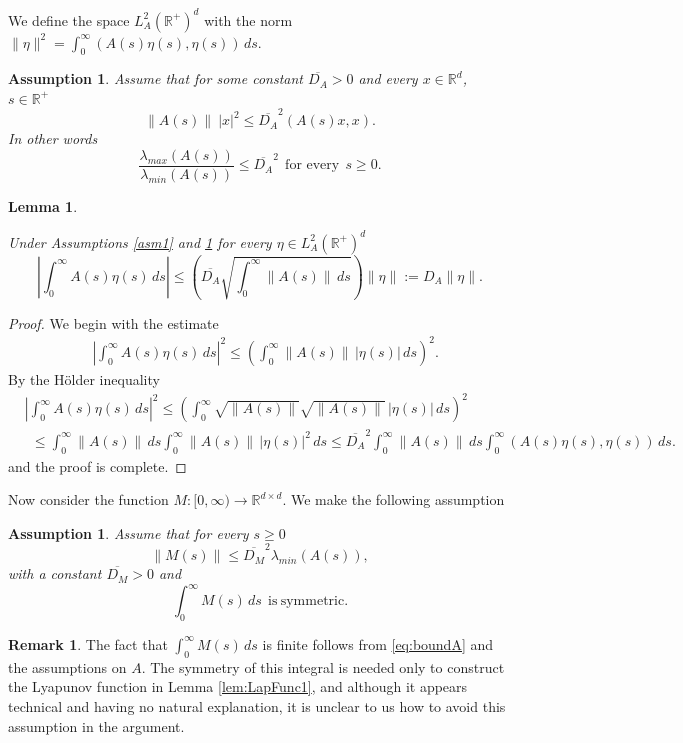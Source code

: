\documentclass[11pt, leqno]{amsart}
\newtheorem{lem}[thm]{Lemma}
\newtheorem{asm}[thm]{Assumption}
\theoremstyle{definition}
\newtheorem{rem}[thm]{Remark}
\def\R{\mathbb{R}}
\begin{document}
We define the space $L^2_A(\R^+)^d$ with the norm  $\|\eta\|^2 = \int_0^\infty (A(s)\eta(s),\eta(s))\, ds.$
\begin{asm} \label{asm:a2}
	Assume that for some constant $\overline{D_A}>0$ and every $x\in \mathbb{R}^d$, $s\in \mathbb{R}^+$
	\begin{equation}\label{eq:A_property}
		\|A(s)\|\ |x|^2 \leq \overline{D_A}^2(A(s)x,x).
	\end{equation}
	In other words
	$$
	\frac{\lambda_{max}(A(s))}{\lambda_{min}(A(s))} \leq \overline{D_A}^2\ \ \textrm{for every}\ \ s\geq 0.
	$$
\end{asm}
\begin{lem}\label{lem:a_prop}
	
	Under Assumptions \ref{asm1} and \ref{asm:a2} for every $\eta \in L^2_A(\mathbb{R}^+)^d$
	$$
	\left|\int_0^\infty A(s)\eta(s)\, ds \right| \leq \left(\overline{D_A}\sqrt{ \int_0^\infty \|A(s)\|\, ds}\right)\|\eta\| := D_A\|\eta\|.
	$$
\end{lem}
\begin{proof} We begin with the estimate
	\begin{align*}
		& \left|\int_0^\infty A(s)\eta(s)\, ds \right|^2 \leq \left(\int_0^\infty \|A(s)\|\, |\eta(s)|\, ds \right)^2.
	\end{align*}
	By the H\"older inequality
	\begin{align*}
		&
		\left|\int_0^\infty A(s)\eta(s)\, ds \right|^2 \leq \left(\int_0^\infty \sqrt{\|A(s)\|} \sqrt{\|A(s)\|}\,  |\eta(s)|\, ds \right)^2\\
		& \ \ \leq \int_0^\infty \|A(s)\|\, ds \int_0^\infty \|A(s)\|\, |\eta(s)|^2\, ds \leq \overline{D_A}^2\int_0^\infty \|A(s)\|\, ds \int_0^\infty (A(s)\eta(s),\eta(s))\, ds.
	\end{align*}
	and the proof is complete.
\end{proof}


Now consider the function $M:[0,\infty) \to \R^{d\times d}$. We make the following assumption
\begin{asm}\label{asm:M}
	Assume that for every $s\geq 0$
	\begin{equation}\label{eq:boundA}
	{\|M(s)\|} \leq \overline{D_M}^2 \lambda_{min}(A(s)),
	\end{equation}
	with a constant $\overline{D_M} > 0$ and
	$$
	\int_0^\infty M(s)\, ds\ \ \mathrm{is\ symmetric}.
	$$
\end{asm}
\begin{rem} The fact that $\int_0^\infty M(s)\, ds$ is finite follows from \eqref{eq:boundA} and the assumptions on $A$. The symmetry of this integral is needed only  to construct the Lyapunov function in Lemma \ref{lem:LapFunc1}, and although it appears technical and having no natural explanation, it is unclear to us how to avoid this assumption in the argument. \end{rem}
\end{document}
